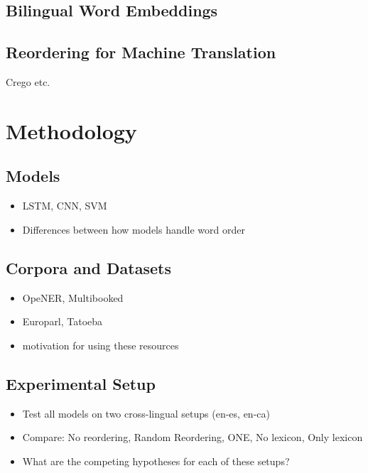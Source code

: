 \documentclass[11pt,a4paper]{article}
\begin{document}
\cite{Mohammad2015b}

\subsection{Bilingual Word Embeddings}

\subsection{Reordering for Machine Translation}
Crego etc.

\section{Methodology}

\subsection{Models}

\begin{itemize}
\item LSTM, CNN, SVM
\item Differences between how models handle word order
\end{itemize}

\subsection{Corpora and Datasets}

\begin{itemize}
\item OpeNER, Multibooked
\item Europarl, Tatoeba
\item motivation for using these resources
\end{itemize}

\subsection{Experimental Setup}

\begin{itemize}
\item Test all models on two cross-lingual setups (en-es, en-ca)
\item Compare: No reordering, Random Reordering, ONE, No lexicon, Only lexicon
\item What are the competing hypotheses for each of these setups?
\end{itemize}
\end{document}
